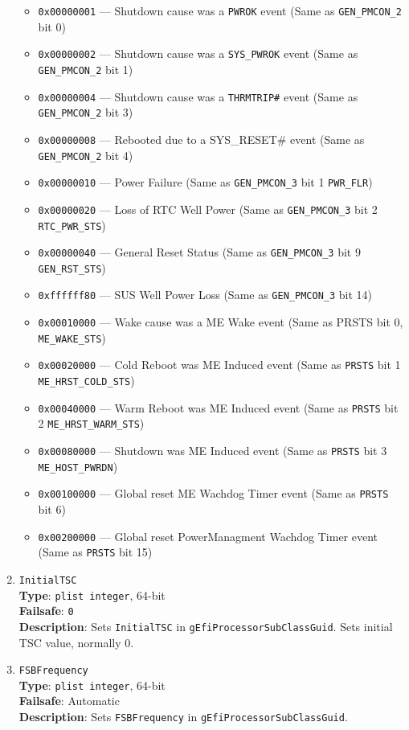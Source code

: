\documentclass[]{article}
\providecommand{\tightlist}{%
  \setlength{\itemsep}{0pt}\setlength{\parskip}{0pt}}
\begin{document}
\begin{enumerate}
  \begin{itemize}
  \tightlist
  \item
    \texttt{0x00000001} --- Shutdown cause was a \texttt{PWROK} event
    (Same as \texttt{GEN\_PMCON\_2} bit 0)
  \item
    \texttt{0x00000002} --- Shutdown cause was a \texttt{SYS\_PWROK}
    event (Same as \texttt{GEN\_PMCON\_2} bit 1)
  \item
    \texttt{0x00000004} --- Shutdown cause was a \texttt{THRMTRIP\#}
    event (Same as \texttt{GEN\_PMCON\_2} bit 3)
  \item
    \texttt{0x00000008} --- Rebooted due to a SYS\_RESET\# event (Same
    as \texttt{GEN\_PMCON\_2} bit 4)
  \item
    \texttt{0x00000010} --- Power Failure (Same as
    \texttt{GEN\_PMCON\_3} bit 1 \texttt{PWR\_FLR})
  \item
    \texttt{0x00000020} --- Loss of RTC Well Power (Same as
    \texttt{GEN\_PMCON\_3} bit 2 \texttt{RTC\_PWR\_STS})
  \item
    \texttt{0x00000040} --- General Reset Status (Same as
    \texttt{GEN\_PMCON\_3} bit 9 \texttt{GEN\_RST\_STS})
  \item
    \texttt{0xffffff80} --- SUS Well Power Loss (Same as
    \texttt{GEN\_PMCON\_3} bit 14)
  \item
    \texttt{0x00010000} --- Wake cause was a ME Wake event (Same as
    PRSTS bit 0, \texttt{ME\_WAKE\_STS})
  \item
    \texttt{0x00020000} --- Cold Reboot was ME Induced event (Same as
    \texttt{PRSTS} bit 1 \texttt{ME\_HRST\_COLD\_STS})
  \item
    \texttt{0x00040000} --- Warm Reboot was ME Induced event (Same as
    \texttt{PRSTS} bit 2 \texttt{ME\_HRST\_WARM\_STS})
  \item
    \texttt{0x00080000} --- Shutdown was ME Induced event (Same as
    \texttt{PRSTS} bit 3 \texttt{ME\_HOST\_PWRDN})
  \item
    \texttt{0x00100000} --- Global reset ME Wachdog Timer event (Same as
    \texttt{PRSTS} bit 6)
  \item
    \texttt{0x00200000} --- Global reset PowerManagment Wachdog Timer
    event (Same as \texttt{PRSTS} bit 15)
  \end{itemize}
\item
  \texttt{InitialTSC}\\
  \textbf{Type}: \texttt{plist\ integer}, 64-bit\\
  \textbf{Failsafe}: \texttt{0}\\
  \textbf{Description}: Sets \texttt{InitialTSC} in
  \texttt{gEfiProcessorSubClassGuid}. Sets initial TSC value, normally
  0.
\item
  \texttt{FSBFrequency}\\
  \textbf{Type}: \texttt{plist\ integer}, 64-bit\\
  \textbf{Failsafe}: Automatic\\
  \textbf{Description}: Sets \texttt{FSBFrequency} in
  \texttt{gEfiProcessorSubClassGuid}.


\end{enumerate}
\end{document}
